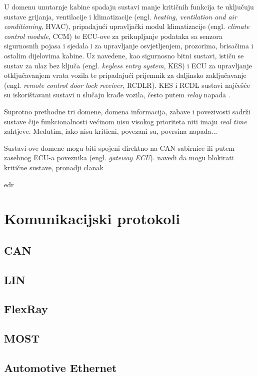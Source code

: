 \documentclass[times, utf8, diplomski, numeric]{fer}
\begin{document}
U domenu unutarnje kabine spadaju sustavi manje kritičnih funkcija te uključuju sustave grijanja, ventilacije i klimatizacije (engl. \textit{heating, ventilation and air conditioning}, HVAC), pripadajući upravljački modul klimatizacije (engl. \textit{climate control module}, CCM) te ECU-ove za prikupljanje podataka sa senzora sigurnosnih pojasa i sjedala i za upravljanje osvjetljenjem, prozorima, brisačima i ostalim dijelovima kabine. Uz navedene, kao sigurnosno bitni sustavi, ističu se sustav za ulaz bez ključa (engl. \textit{keyless entry system}, KES) i ECU za upravljanje otključavanjem vrata vozila te pripadajući prijemnik za daljinsko zaključavanje (engl. \textit{remote control door lock receiver}, RCDLR). KES i RCDL sustavi najčešće su iskorištavani sustavi u slučaju krađe vozila, često putem \textit{relay} napada \cite{nasser2023automotive, cbc2020relay}.

Suprotno prethodne tri domene, domena informacija, zabave i povezivosti sadrži sustave čije funkcionalnosti većinom nisu visokog prioriteta niti imaju \textit{real time} zahtjeve. Međutim, iako nisu kriticni, povezani su, povrsina napada... 



Sustavi ove domene mogu biti spojeni direktno na CAN sabirnice ili putem zasebnog ECU-a poveznika (engl. \textit{gateway ECU}).
navedi da mogu blokirati kritične sustave, pronadji clanak

edr

\section{Komunikacijski protokoli}
\subsection{CAN}
\subsection{LIN}
\subsection{FlexRay}
\subsection{MOST}
\subsection{Automotive Ethernet}
\end{document}
